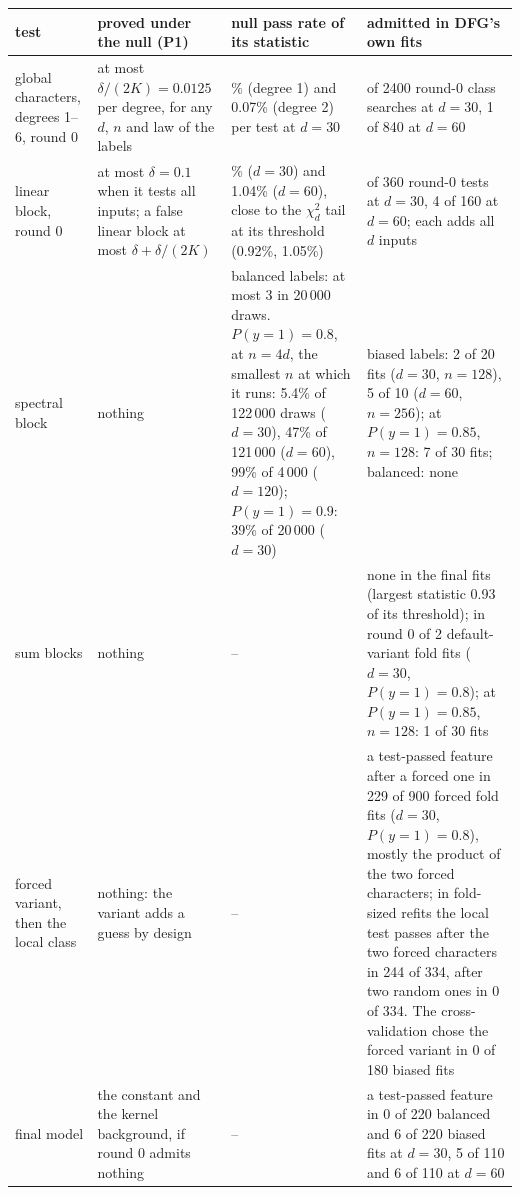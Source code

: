 \begin{tabularx}{\linewidth}{@{}>{\raggedright\arraybackslash}p{2.25cm}>{\raggedright\arraybackslash}p{3.1cm}>{\raggedright\arraybackslash}X>{\raggedright\arraybackslash}X@{}}
\toprule
test & proved under the null (P1) & null pass rate of its statistic & admitted in DFG's own fits\\
\midrule
global characters, degrees 1--6, round 0 & at most $\delta/(2K)=0.0125$ per degree, for any $d$, $n$ and law of the labels & 0.11\% (degree 1) and 0.07\% (degree 2) per test at $d=30$ & 2 of 2400 round-0 class searches at $d=30$, 1 of 840 at $d=60$\\
linear block, round 0 & at most $\delta=0.1$ when it tests all inputs; a false linear block at most $\delta+\delta/(2K)$ & 0.84\% ($d=30$) and 1.04\% ($d=60$), close to the $\chi^2_d$ tail at its threshold (0.92\%, 1.05\%) & 2 of 360 round-0 tests at $d=30$, 4 of 160 at $d=60$; each adds all $d$ inputs\\
spectral block & nothing & balanced labels: at most 3 in 20\,000 draws. $P(y{=}1)=0.8$, at $n=4d$, the smallest $n$ at which it runs: 5.4\% of 122\,000 draws ($d=30$), 47\% of 121\,000 ($d=60$), 99\% of 4\,000 ($d=120$); $P(y{=}1)=0.9$: 39\% of 20\,000 ($d=30$) & biased labels: 2 of 20 fits ($d=30$, $n=128$), 5 of 10 ($d=60$, $n=256$); at $P(y{=}1)=0.85$, $n=128$: 7 of 30 fits; balanced: none\\
sum blocks & nothing & -- & none in the final fits (largest statistic 0.93 of its threshold); in round 0 of 2 default-variant fold fits ($d=30$, $P(y{=}1)=0.8$); at $P(y{=}1)=0.85$, $n=128$: 1 of 30 fits\\
forced variant, then the local class & nothing: the variant adds a guess by design & -- & a test-passed feature after a forced one in 229 of 900 forced fold fits ($d=30$, $P(y{=}1)=0.8$), mostly the product of the two forced characters; in fold-sized refits the local test passes after the two forced characters in 244 of 334, after two random ones in 0 of 334. The cross-validation chose the forced variant in 0 of 180 biased fits\\
\midrule
final model & the constant and the kernel background, if round 0 admits nothing & -- & a test-passed feature in 0 of 220 balanced and 6 of 220 biased fits at $d=30$, 5 of 110 and 6 of 110 at $d=60$\\
\bottomrule
\end{tabularx}
